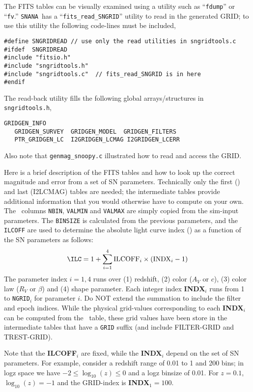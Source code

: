 \documentclass[12pt]{article}
\newcommand{\snana}{{\tt SNANA}}
\begin{document}
The FITS tables can be visually examined using a utility such
as ``{\tt fdump}'' or ``{\tt fv}.''
\snana\ has a ``{\tt fits\_read\_SNGRID}'' utility to read
in the generated GRID; to use this utility the following 
code-lines must be included,
%
\begin{Verbatim}[frame=single]
#define SNGRIDREAD // use only the read utilities in sngridtools.c
#ifdef  SNGRIDREAD
#include "fitsio.h"
#include "sngridtools.h" 
#include "sngridtools.c"  // fits_read_SNGRID is in here
#endif
\end{Verbatim}
%
The read-back utility fills the following global arrays/structures
in {\tt sngridtools.h},
\begin{Verbatim}[frame=single]
   GRIDGEN_INFO
   GRIDGEN_SURVEY  GRIDGEN_MODEL  GRIDGEN_FILTERS
   PTR_GRIDGEN_LC  I2GRIDGEN_LCMAG I2GRIDGEN_LCERR
\end{Verbatim}
%
Also note that {\tt genmag\_snoopy.c} illustrated how
to read and access the GRID.

\bigskip

Here is a brief description of the FITS tables and how to look up
the correct magnitude and error from a set of SN parameters.
Technically only the first ({\SNPARINFO}) and last (I2LCMAG) tables 
are needed; the intermediate tables provide additional information
that you would otherwise have to compute on your own.
The \SNPARINFO\ columns {\tt NBIN}, {\tt VALMIN} and {\tt VALMAX} 
are simply copied from the sim-input parameters. 
The {\tt BINSIZE} is calculated from the previous parameters, 
and the {\tt ILCOFF} are used to determine the absolute
light curve index ({\ILC}) as a function of the 
SN parameters as follows:
%
\begin{equation}
   {\rm \ILC} = 1 + \sum_{i=1}^4 {\rm ILCOFF}_i \times ({\rm INDX}_i - 1)
   \label{eq:ilcoff}
\end{equation}
%
The parameter index $i=1,4$ runs over 
(1) redshift, 
(2) color ($A_V$ or $c$), 
(3) color law ($R_V$ or $\beta$) and
(4) shape parameter.
Each integer index {\bf INDX}$_i$ runs from 1 to {\tt NGRID}$_i$ 
for parameter $i$.
Do NOT extend the summation to include the filter and epoch indices.
While the physical grid-values corresponding to each {\bf INDX}$_i$ 
can be computed from the \SNPARINFO\ table,
these grid values have been store in the intermediate tables that 
have a {\tt GRID} suffix
(and include FILTER-GRID and TREST-GRID).

Note that the {\bf ILCOFF}$_i$ are fixed,
while the {\bf INDX}$_i$ depend on the set of SN parameters.
For example, consider a redshift range of 0.01 to 1
and 200 bins; in logz space we have $-2 \le \log_{10}(z) \le 0$
and a logz binsize of 0.01.
For $z=0.1$, $\log_{10}(z) = -1$ and the GRID-index is
{\bf INDX}$_{1} = 100$.
\end{document}
